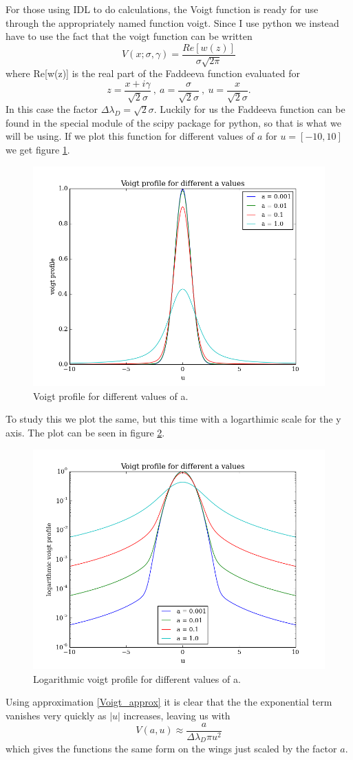 \documentclass{aa}   %
\begin{document}
For those using IDL to do calculations, the Voigt function is ready for use through the appropriately named function voigt.
Since I use python we instead have to use the fact that the voigt function can be written
\begin{equation}
 V(x;\sigma,\gamma) = \frac{Re[w(z)]}{\sigma \sqrt{2\pi}}
\end{equation}
where Re[w(z)] is the real part of the Faddeeva function evaluated for 
\[
 z = \frac{x + i\gamma}{\sqrt{2}\sigma} ~,~ a = \frac{\sigma}{\sqrt{2}\sigma} ~,~ u = \frac{x}{\sqrt{2}\sigma}.
\]
In this case the factor $\Delta\lambda_D = \sqrt{2}\sigma$.
Luckily for us the Faddeeva function can be found in the special module of the scipy package for python, so that is what we will be using. If we plot this function for different values of $a$ for $u = [-10, 10]$ we get figure \ref{voigt_orig}.
\begin{figure}
\includegraphics[width=.49\textwidth]{voigt_original.png}
\caption{Voigt profile for different values of a.}
\label{voigt_orig}
\end{figure}
To study this we plot the same, but this time with a logarthimic scale for the y axis. The plot can be seen in figure \ref{voigt_ylog}.
\begin{figure}
\includegraphics[width=.49\textwidth]{voigt_ylog.png}
\caption{Logarithmic voigt profile for different values of a.}
\label{voigt_ylog}
\end{figure}
Using approximation \ref{Voigt_approx} it is clear that the the exponential term vanishes very quickly as $|u|$ increases, leaving us with
\[
 V(a,u) \approx \frac{a}{\Delta\lambda_D\pi u^2} 
\]
which gives the functions the same form on the wings just scaled by the factor $a$.
\end{document}
